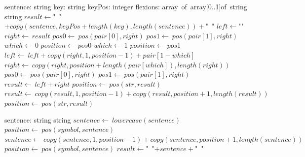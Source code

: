 \documentclass[a4paper,10pt]{article}
\begin{document}
\begin{algorithm}
\caption{conjugateStrings(4)}
\begin{algorithmic}[5]
    \State sentence: string
    \State key: string
    \State keyPos: integer
    \State flexions: array\ of\ array[0..1]of\ string
  \EndDecl
    \State string
  \EndDecl
  \State \(result\gets\)"{}\ "{}\(+copy(sentence,keyPos+length(key),length(sentence))+\)"{}\ "{}\(\)
    \State \(left\gets\)"{}"{}\(\)
    \State \(right\gets\ result\)
    \State \(pos0\gets\ pos(pair[0],right)\)
    \State \(pos1\gets\ pos(pair[1],right)\)
      \State \(which\gets\ 0\)
      \State \(position\gets\ pos0\)
        \State \(which\gets\ 1\)
        \State \(position\gets\ pos1\)
      \EndIf
      \State \(left\gets\ left+copy(right,1,position-1)+pair[1-which]\)
      \State \(right\gets\ copy(right,position+length(pair[which]),length(right))\)
      \State \(pos0\gets\ pos(pair[0],right)\)
      \State \(pos1\gets\ pos(pair[1],right)\)
    \EndWhile
    \State \(result\gets\ left+right\)
  \EndFor
    \State \(position\gets\ pos(str,result)\)
      \State \(result\gets\ copy(result,1,position-1)+copy(result,position+1,length(result))\)
      \State \(position\gets\ pos(str,result)\)
    \EndWhile
  \EndFor
\EndFunction
\end{algorithmic}
\end{algorithm}


\begin{algorithm}
\caption{normalizeInput(1)}
\begin{algorithmic}[5]
\State {}
\State {}
\State {}
    \State sentence: string
  \EndDecl
    \State string
  \EndDecl
  \State \(sentence\gets\ lowercase(sentence)\)
    \State \(position\gets\ pos(symbol,sentence)\)
      \State \(sentence\gets\ copy(sentence,1,position-1)+copy(sentence,position+1,length(sentence))\)
      \State \(position\gets\ pos(symbol,sentence)\)
    \EndWhile
  \EndFor
  \State \(result\gets\)"{}\ "{}\(+sentence+\)"{}\ "{}\(\)
\EndFunction
\end{algorithmic}
\end{algorithm}
\end{document}
